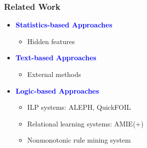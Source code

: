 \documentclass{beamer}
\newcommand{\naf}{{\it not}\,}
\newcommand{\bl}[1]{\textcolor{blue}{#1}}
\newcommand{\gr}[1]{\textcolor{darkgreen}{#1}}
\def\cG{\ensuremath{\mathcal{G}}}
\def\cR{\ensuremath{\mathcal{R}}}
\newcommand{\mi}[1]{\ensuremath{\mathit{#1}}}
\begin{document}
%
%
%
%
\begin{frame}\frametitle{Related Work}
\begin{itemize}
\item \textbf{\bl{Statistics-based Approaches}}
\begin{itemize}
\item Hidden features~\cite{rescal}
\end{itemize}
\medskip
\bigskip

\item \textbf{\bl{Text-based Approaches}}
\begin{itemize}
\item External methods~\cite{match}
\end{itemize}
\medskip
\bigskip

\item \textbf{\bl{Logic-based Approaches}}
\begin{itemize}
\item ILP systems: ALEPH, QuickFOIL~\cite{quickfoil}
\item Relational learning systems: AMIE(+)~\cite{amie}
\item Nonmonotonic rule mining system~\cite{iswc2016}
\end{itemize}
\medskip

\end{itemize}
\end{frame}


\end{document}
